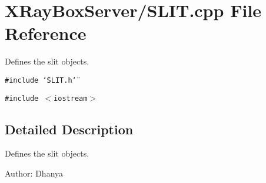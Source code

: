 \section{XRay\-Box\-Server/SLIT.cpp File Reference}
\label{SLIT_8cpp}
Defines the slit objects. 

{\tt \#include \char`\"{}SLIT.h\char`\"{}}\par
{\tt \#include $<$iostream$>$}\par


\subsection{Detailed Description}
Defines the slit objects. 

\begin{Desc}
\item[Author:]Dhanya \end{Desc}
